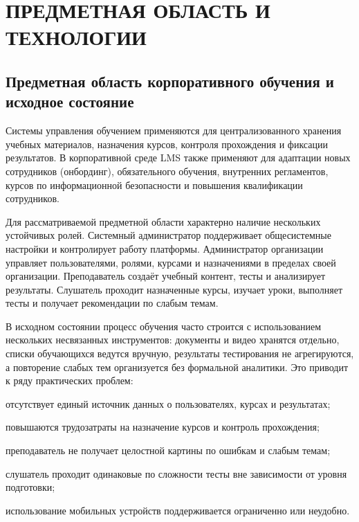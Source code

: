 \chapter{{\fontsize{14pt}{21pt}\selectfont\MakeUppercase{Предметная область и технологии}}}
\label{cha:analysis}

\section{Предметная область корпоративного обучения и исходное состояние}

Системы управления обучением применяются для централизованного хранения учебных материалов, назначения курсов, контроля прохождения и фиксации результатов. В корпоративной среде LMS также применяют для адаптации новых сотрудников (онбординг), обязательного обучения, внутренних регламентов, курсов по информационной безопасности и повышения квалификации сотрудников\cite{moodle_lms,open_lms}.

Для рассматриваемой предметной области характерно наличие нескольких устойчивых ролей. Системный администратор поддерживает общесистемные настройки и контролирует работу платформы. Администратор организации управляет пользователями, ролями, курсами и назначениями в пределах своей организации. Преподаватель создаёт учебный контент, тесты и анализирует результаты. Слушатель проходит назначенные курсы, изучает уроки, выполняет тесты и получает рекомендации по слабым темам.

В исходном состоянии процесс обучения часто строится с использованием нескольких несвязанных инструментов: документы и видео хранятся отдельно, списки обучающихся ведутся вручную, результаты тестирования не агрегируются, а повторение слабых тем организуется без формальной аналитики. Это приводит к ряду практических проблем:
\begin{parenlist}
  \item отсутствует единый источник данных о пользователях, курсах и результатах;
  \item повышаются трудозатраты на назначение курсов и контроль прохождения;
  \item преподаватель не получает целостной картины по ошибкам и слабым темам;
  \item слушатель проходит одинаковые по сложности тесты вне зависимости от уровня подготовки;
  \item использование мобильных устройств поддерживается ограниченно или неудобно.
\end{parenlist}

